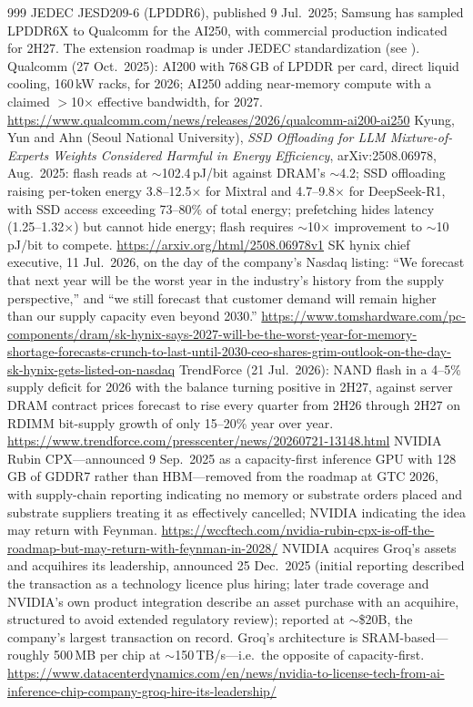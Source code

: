 \begin{thebibliography}{999}
 JEDEC JESD209-6 (LPDDR6), published 9 Jul.\ 2025; Samsung has sampled LPDDR6X to Qualcomm for the AI250, with commercial production indicated for 2H27. The extension roadmap is under JEDEC standardization (see \cite{jedec-lpddr6-roadmap}).
 Qualcomm (27 Oct.\ 2025): AI200 with 768\,GB of LPDDR per card, direct liquid cooling, 160\,kW racks, for 2026; AI250 adding near-memory compute with a claimed $>$10$\times$ effective bandwidth, for 2027. \url{https://www.qualcomm.com/news/releases/2026/qualcomm-ai200-ai250}
 Kyung, Yun and Ahn (Seoul National University), \emph{SSD Offloading for LLM Mixture-of-Experts Weights Considered Harmful in Energy Efficiency}, arXiv:2508.06978, Aug.\ 2025: flash reads at $\sim$102.4\,pJ/bit against DRAM's $\sim$4.2; SSD offloading raising per-token energy 3.8--12.5$\times$ for Mixtral and 4.7--9.8$\times$ for DeepSeek-R1, with SSD access exceeding 73--80\% of total energy; prefetching hides latency (1.25--1.32$\times$) but cannot hide energy; flash requires $\sim$10$\times$ improvement to $\sim$10\,pJ/bit to compete. \url{https://arxiv.org/html/2508.06978v1}
 SK hynix chief executive, 11 Jul.\ 2026, on the day of the company's Nasdaq listing: ``We forecast that next year will be the worst year in the industry's history from the supply perspective,'' and ``we still forecast that customer demand will remain higher than our supply capacity even beyond 2030.'' \url{https://www.tomshardware.com/pc-components/dram/sk-hynix-says-2027-will-be-the-worst-year-for-memory-shortage-forecasts-crunch-to-last-until-2030-ceo-shares-grim-outlook-on-the-day-sk-hynix-gets-listed-on-nasdaq}
 TrendForce (21 Jul.\ 2026): NAND flash in a 4--5\% supply deficit for 2026 with the balance turning positive in 2H27, against server DRAM contract prices forecast to rise every quarter from 2H26 through 2H27 on RDIMM bit-supply growth of only 15--20\% year over year. \url{https://www.trendforce.com/presscenter/news/20260721-13148.html}
 NVIDIA Rubin CPX---announced 9 Sep.\ 2025 as a capacity-first inference GPU with 128\,GB of GDDR7 rather than HBM---removed from the roadmap at GTC 2026, with supply-chain reporting indicating no memory or substrate orders placed and substrate suppliers treating it as effectively cancelled; NVIDIA indicating the idea may return with Feynman. \url{https://wccftech.com/nvidia-rubin-cpx-is-off-the-roadmap-but-may-return-with-feynman-in-2028/}
 NVIDIA acquires Groq's assets and acquihires its leadership, announced 25 Dec.\ 2025 (initial reporting described the transaction as a technology licence plus hiring; later trade coverage and NVIDIA's own product integration describe an asset purchase with an acquihire, structured to avoid extended regulatory review); reported at $\sim$\$20B, the company's largest transaction on record. Groq's architecture is SRAM-based---roughly 500\,MB per chip at $\sim$150\,TB/s---i.e.\ the opposite of capacity-first. \url{https://www.datacenterdynamics.com/en/news/nvidia-to-license-tech-from-ai-inference-chip-company-groq-hire-its-leadership/}

\end{thebibliography}
